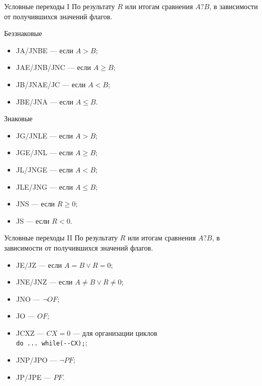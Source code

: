 \documentclass[xetex,aspectratio=43]{beamer}
\begin{document}
\begin{frame}{Условные переходы I}
    По результату \(R\) или итогам сравнения \(A ? B\), в зависимости от
    получившихся значений флагов.

    Беззнаковые

    \begin{itemize}
        \tightlist
        \item
        JA/JNBE --- если \(A > B\);
        \item
        JAE/JNB/JNC --- если \(A \ge B\);
        \item
        JB/JNAE/JC --- если \(A < B\);
        \item
        JBE/JNA --- если \(A \le B\).
    \end{itemize}

    Знаковые

    \begin{itemize}
        \tightlist
        \item
        JG/JNLE --- если \(A > B\);
        \item
        JGE/JNL --- если \(A \ge B\);
        \item
        JL/JNGE --- если \(A < B\);
        \item
        JLE/JNG --- если \(A \le B\);
        \item
        JNS --- если \(R\ge 0\);
        \item
        JS --- если \(R<0\).
    \end{itemize}
\end{frame}

\begin{frame}[fragile]{Условные переходы II}
    По результату \(R\) или итогам сравнения \(A ? B\), в зависимости от
    получившихся значений флагов.

    \begin{itemize}
        \item
        JE/JZ --- если \(A=B \lor R = 0\);
        \item
        JNE/JNZ --- если \(A \not = B \lor R \not = 0\);
        \item
        JNO --- \(\neg OF\);
        \item
        JO --- \(OF\);
        \item
        JCXZ --- \(CX = 0\) --- для организации циклов\\
        \texttt{do\ ...\ while(-\/-CX);};
        \item
        JNP/JPO --- \(\neg PF\);
        \item
        JP/JPE --- \(PF\).
    \end{itemize}
\end{frame}
\end{document}
